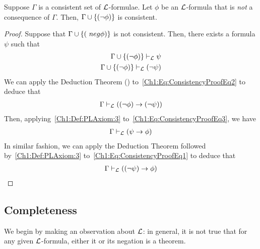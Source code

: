 \begin{boxproposition}\label{Ch1:Prop:ConsistencyUnion}
    Suppose $\Gamma$ is a consistent set of $\mathcal{L}$-formulae. Let $\phi$ be an $\mathcal{L}$-formula that is \emph{not} a consequence of $\Gamma$. Then, $\Gamma \cup \left\{ \left( \neg \phi \right) \right\}$ is consistent.
\end{boxproposition}
\begin{proof}
    Suppose that $\Gamma \cup \left\{ \left( \ neg \phi \right) \right\}$ is not consistent. Then, there exists a formula $\psi$ such that
    \begin{align}
        \Gamma \cup \left\{ \left( \neg \phi \right) \right\} \vdash_{\mathcal{L}} \psi
        \label{Ch1:Eq:ConsistencyProofEq1} \\
        \Gamma \cup \left\{ \left( \neg \phi \right) \right\} \vdash_{\mathcal{L}} \left( \neg \psi \right)
        \label{Ch1:Eq:ConsistencyProofEq2}
    \end{align}
    We can apply the Deduction Theorem () to~\eqref{Ch1:Eq:ConsistencyProofEq2} to deduce that
    \begin{align}
        \Gamma \vdash_{\mathcal{L}} \left( \left( \neg \phi \right) \to \left( \neg \psi \right) \right)
        \label{Ch1:Eq:ConsistencyProofEq3}
    \end{align}
    Then, applying~\ref{Ch1:Def:PLAxiom:3} to~\eqref{Ch1:Eq:ConsistencyProofEq3}, we have
    \begin{align}
        \Gamma \vdash_{\mathcal{L}} \left( \psi \to \phi \right)
        \label{Ch1:Eq:ConsistencyProofEq4}
    \end{align}
    In similar fashion, we can apply the Deduction Theorem followed by~\ref{Ch1:Def:PLAxiom:3} to~\eqref{Ch1:Eq:ConsistencyProofEq1} to deduce that
    \begin{align}
        \Gamma \vdash_{\mathcal{L}} \left( \left( \neg \psi \right) \to \phi \right)
        \label{Ch1:Eq:ConsistencyProofEq5}
    \end{align}
    \sorry %
\end{proof}

\subsection{Completeness}

We begin by making an observation about $\mathcal{L}$: in general, it is not true that for any given $\mathcal{L}$-formula, either it or its negation is a theorem.

